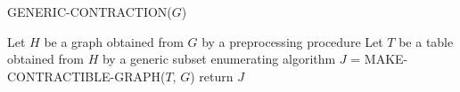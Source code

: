 \begin{algorithm}[H]
    \caption{GENERIC-CONTRACTION($G$)}\label{alg:generic-contraction}
    \begin{algorithmic}[1]
        \State Let $H$ be a graph obtained from $G$ by a preprocessing procedure
        \State Let $T$ be a table obtained from $H$ by a generic subset enumerating algorithm
        \State $J$ = MAKE-CONTRACTIBLE-GRAPH($T$, $G$)
        \State return $J$
    \end{algorithmic}
\end{algorithm}